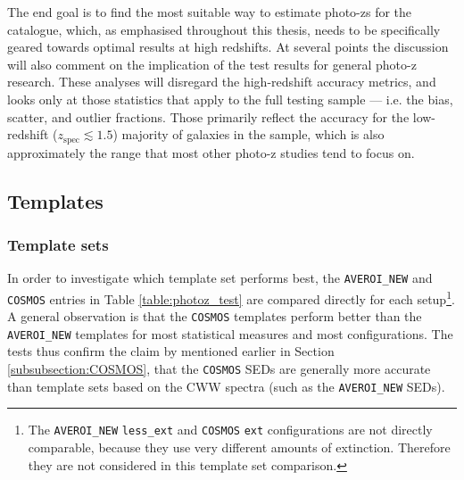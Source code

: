 The end goal is to find the most suitable way to estimate photo-zs for the \DESVIDEO catalogue, which, as emphasised throughout this thesis, needs to be specifically geared towards optimal results at high redshifts.  At several points the discussion will also comment on the implication of the test results for general photo-z research. These analyses will disregard the high-redshift accuracy metrics, and looks only at those statistics that apply to the full testing sample --- i.e. the bias, scatter, and outlier fractions. Those primarily reflect the accuracy for the low-redshift ($z_{\mathrm{spec}}\lesssim1.5$) majority of galaxies in the sample, which is also approximately the range that most other photo-z studies tend to focus on.\par




\subsection{Templates}
\subsubsection{Template sets}\label{subsubsection:template_sets}
In order to investigate which template set performs best, the \texttt{AVEROI\_NEW} and \texttt{COSMOS} entries in Table \ref{table:photoz_test} are compared directly for each setup\footnote{The \texttt{AVEROI\_NEW} \texttt{less\_ext} and \texttt{COSMOS} \texttt{ext} configurations are not directly comparable, because they use very different amounts of extinction. Therefore they are not considered in this template set comparison.}. A general observation is that the \texttt{COSMOS} templates perform better than the \texttt{AVEROI\_NEW} templates for most statistical measures and most configurations. The \DESVIDEO tests thus confirm the claim by \cite{2009ApJ...690.1236I} mentioned earlier in Section \ref{subsubsection:COSMOS}, that the \texttt{COSMOS} SEDs are generally more accurate than template sets based on the CWW spectra (such as the \texttt{AVEROI\_NEW} SEDs). \par


